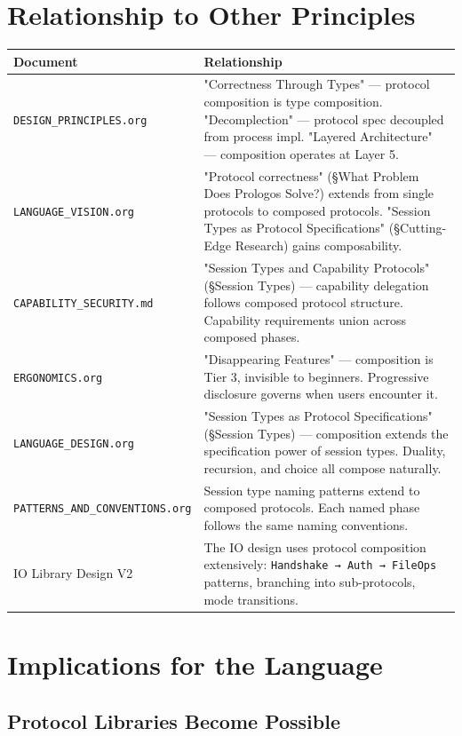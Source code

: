 \documentclass[11pt]{article}
\begin{document}
\section{Relationship to Other Principles}
\label{sec:org905386c}

\begin{center}
\begin{tabular}{ll}
Document & Relationship\\
\hline
\texttt{DESIGN\_PRINCIPLES.org} & "Correctness Through Types" --- protocol composition is type composition. "Decomplection" --- protocol spec decoupled from process impl. "Layered Architecture" --- composition operates at Layer 5.\\
\texttt{LANGUAGE\_VISION.org} & "Protocol correctness" (§What Problem Does Prologos Solve?) extends from single protocols to composed protocols. "Session Types as Protocol Specifications" (§Cutting-Edge Research) gains composability.\\
\texttt{CAPABILITY\_SECURITY.md} & "Session Types and Capability Protocols" (§Session Types) --- capability delegation follows composed protocol structure. Capability requirements union across composed phases.\\
\texttt{ERGONOMICS.org} & "Disappearing Features" --- composition is Tier 3, invisible to beginners. Progressive disclosure governs when users encounter it.\\
\texttt{LANGUAGE\_DESIGN.org} & "Session Types as Protocol Specifications" (§Session Types) --- composition extends the specification power of session types. Duality, recursion, and choice all compose naturally.\\
\texttt{PATTERNS\_AND\_CONVENTIONS.org} & Session type naming patterns extend to composed protocols. Each named phase follows the same naming conventions.\\
IO Library Design V2 & The IO design uses protocol composition extensively: \texttt{Handshake → Auth → FileOps} patterns, branching into sub-protocols, mode transitions.\\
\end{tabular}
\end{center}
\section{Implications for the Language}
\label{sec:org8fb1dbc}

\subsection{Protocol Libraries Become Possible}
\label{sec:org05ba1fc}
\end{document}
